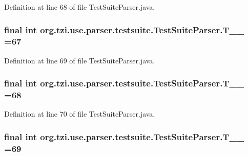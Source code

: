 Definition at line 68 of file Test\-Suite\-Parser.\-java.

\hypertarget{classorg_1_1tzi_1_1use_1_1parser_1_1testsuite_1_1_test_suite_parser_ac5947475d1e35086d9dea41210e03622}{
\subsubsection[{T\-\_\-\-\_\-67}]{\setlength{\rightskip}{0pt plus 5cm}final int org.\-tzi.\-use.\-parser.\-testsuite.\-Test\-Suite\-Parser.\-T\-\_\-\-\_ =67\hspace{0.3cm}{\ttfamily [static]}}}\label{classorg_1_1tzi_1_1use_1_1parser_1_1testsuite_1_1_test_suite_parser_ac5947475d1e35086d9dea41210e03622}


Definition at line 69 of file Test\-Suite\-Parser.\-java.

\hypertarget{classorg_1_1tzi_1_1use_1_1parser_1_1testsuite_1_1_test_suite_parser_a92bdcbd3be2adb362fa8ba976166d4f5}{
\subsubsection[{T\-\_\-\-\_\-68}]{\setlength{\rightskip}{0pt plus 5cm}final int org.\-tzi.\-use.\-parser.\-testsuite.\-Test\-Suite\-Parser.\-T\-\_\-\-\_ =68\hspace{0.3cm}{\ttfamily [static]}}}\label{classorg_1_1tzi_1_1use_1_1parser_1_1testsuite_1_1_test_suite_parser_a92bdcbd3be2adb362fa8ba976166d4f5}


Definition at line 70 of file Test\-Suite\-Parser.\-java.

\hypertarget{classorg_1_1tzi_1_1use_1_1parser_1_1testsuite_1_1_test_suite_parser_a37e404bac5796b0848c4d04005085443}{
\subsubsection[{T\-\_\-\-\_\-69}]{\setlength{\rightskip}{0pt plus 5cm}final int org.\-tzi.\-use.\-parser.\-testsuite.\-Test\-Suite\-Parser.\-T\-\_\-\-\_ =69\hspace{0.3cm}{\ttfamily [static]}}}\label{classorg_1_1tzi_1_1use_1_1parser_1_1testsuite_1_1_test_suite_parser_a37e404bac5796b0848c4d04005085443}


